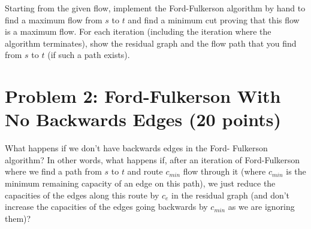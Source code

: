 \documentclass[12pt]{article}
\begin{document}
    \begin{center}
    \end{center}
Starting from the given flow, implement the Ford-Fulkerson algorithm by hand to find a maximum flow from $s$ to $t$ and find a minimum cut proving that this flow is a maximum flow. For each iteration (including the iteration where the algorithm terminates), show the residual graph and the flow path that you find from $s$ to $t$ (if such a path exists).
\section*{Problem 2: Ford-Fulkerson With No Backwards Edges (20 points)}
What happens if we don't have backwards edges in the Ford-
Fulkerson algorithm? In other words, what happens if, after an iteration of Ford-Fulkerson where we find a path from $s$ to $t$ and route $c_{min}$ flow through it
(where $c_{min}$ is the minimum remaining capacity of an edge on this path), we
just reduce the capacities of the edges along this route by $c_e$ in the residual
graph (and don't increase the capacities of the edges going backwards by $c_{min}$
as we are ignoring them)?
\end{document}
